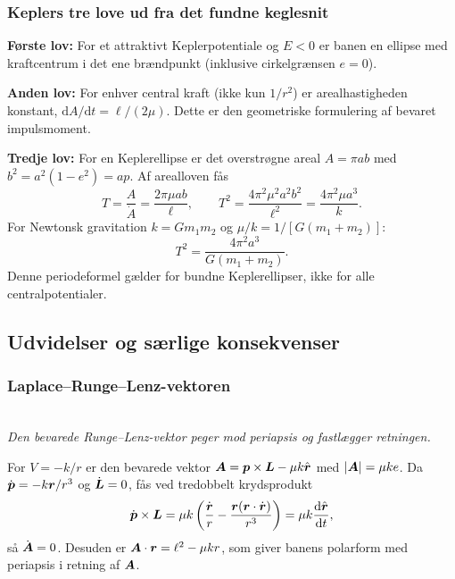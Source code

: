 \subsubsection*{Keplers tre love ud fra det fundne keglesnit}
\textbf{Første lov:} For et attraktivt Keplerpotentiale og $E<0$ er banen en ellipse med kraftcentrum i det ene brændpunkt (inklusive cirkelgrænsen $e=0$).

\textbf{Anden lov:} For enhver central kraft (ikke kun $1/r^2$) er arealhastigheden konstant, $\mathrm dA/\mathrm dt=\ell/(2\mu)$. Dette er den geometriske formulering af bevaret impulsmoment.

\textbf{Tredje lov:} For en Keplerellipse er det overstrøgne areal $A=\pi ab$ med $b^2=a^2(1-e^2)=ap$. Af arealloven fås
\[T=\frac{A}{\dot A}=\frac{2\pi\mu ab}{\ell},\qquad
T^2=\frac{4\pi^2\mu^2a^2b^2}{\ell^2}=\frac{4\pi^2\mu a^3}{k}.\]
For Newtonsk gravitation $k=Gm_1m_2$ og $\mu/k=1/[G(m_1+m_2)]$:
\[\boxed{T^2=\frac{4\pi^2a^3}{G(m_1+m_2)}}.\]
Denne periodeformel gælder for bundne Keplerellipser, ikke for alle centralpotentialer.

\subsection{Udvidelser og særlige konsekvenser}
\subsubsection*{Laplace--Runge--Lenz-vektoren}
\begin{center}\\{\small\itshape Den bevarede Runge--Lenz-vektor peger mod periapsis og fastlægger retningen.}\end{center}
For $V=-k/r$ er den bevarede vektor $\boldsymbol{A}=\boldsymbol{p}\times\boldsymbol{L}-\mu k\hat{\boldsymbol{r}}$ med $|\boldsymbol{A}|=\mu k e$. Da $\dot{\boldsymbol{p}}=-k\boldsymbol{r}/r^3$ og $\dot{\boldsymbol{L}}=0$, fås ved tredobbelt krydsprodukt
\[\dot{\boldsymbol{p}}\times\boldsymbol{L}=\mu k\left(\frac{\dot{\boldsymbol{r}}}r-\frac{\boldsymbol{r}(\boldsymbol{r}\cdot\dot{\boldsymbol{r}})}{r^3}\right)=\mu k\frac{\mathrm d\hat{\boldsymbol{r}}}{\mathrm dt},\]
så $\dot{\boldsymbol{A}}=0$. Desuden er $\boldsymbol{A}\cdot\boldsymbol{r}=\ell^2-\mu kr$, som giver banens polarform med periapsis i retning af $\boldsymbol{A}$.


